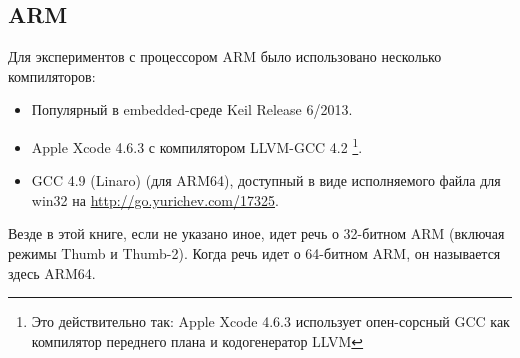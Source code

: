 \subsection{ARM}
\label{sec:hw_ARM}

\myindex{\idevices}
Для экспериментов с процессором ARM было использовано несколько компиляторов:

\begin{itemize}
\item Популярный в embedded-среде Keil Release 6/2013.

\item Apple Xcode 4.6.3 с компилятором LLVM-GCC 4.2
\footnote{Это действительно так: Apple Xcode 4.6.3 использует опен-сорсный GCC как компилятор переднего плана и кодогенератор LLVM}.

\item GCC 4.9 (Linaro) (для ARM64), 
доступный в виде исполняемого файла для win32 на \url{http://go.yurichev.com/17325}.

\end{itemize}

Везде в этой книге, если не указано иное, идет речь о 32-битном ARM (включая режимы Thumb и Thumb-2).
Когда речь идет о 64-битном ARM, он называется здесь ARM64.







